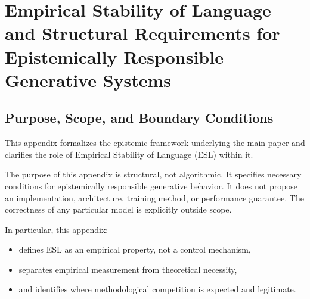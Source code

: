 
\appendix
\section{Empirical Stability of Language and Structural Requirements for Epistemically Responsible Generative Systems}


\subsection{Purpose, Scope, and Boundary Conditions}

This appendix formalizes the epistemic framework underlying the main paper and clarifies the role of Empirical Stability of Language (ESL) within it.

The purpose of this appendix is structural, not algorithmic. It specifies necessary conditions for epistemically responsible generative behavior. It does not propose an implementation, architecture, training method, or performance guarantee. The correctness of any particular model is explicitly outside scope.

In particular, this appendix:
\begin{itemize}
    \item defines ESL as an empirical property, not a control mechanism,
    \item separates empirical measurement from theoretical necessity,
    \item and identifies where methodological competition is expected and legitimate.
\end{itemize}


